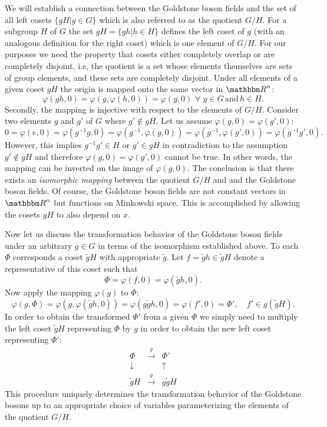 \documentclass[twoside,12pt]{article}
\begin{document}
   We will establish a connection
between the Goldstone boson fields and the set of all left cosets
$\{gH|g\in G\}$ which is also referred to as the quotient $G/H$.
   For a subgroup $H$ of $G$ the set $gH=\{gh|h\in H\}$ defines the left
coset of $g$ (with an analogous definition for the right coset) which is one
element of $G/H$.
   For our purposes we need the property
that cosets either completely overlap or are
completely disjoint,
i.e, the quotient is a
set whose elements themselves are sets of group elements, and these sets
are completely disjoint.
   Under all elements of a given coset $gH$ the origin is mapped onto the
same vector in ${\mathbbm R}^n$:
$$\varphi(gh,0)=\varphi(g,\varphi(h,0))
=\varphi(g,0)\,\,\forall\,\, g\in G\,
\mbox{and}\, h\in H.$$
   Secondly, the mapping is injective with respect to the elements
of $G/H$.
Consider two elements $g$ and $g'$ of $G$ where $g'\not\in g H$.
   Let us assume $\varphi(g,0)=\varphi(g',0)$:
$$0=\varphi(e,0)=\varphi(g^{-1}g,0)
=\varphi(g^{-1},\varphi(g,0))
=\varphi(g^{-1},\varphi(g',0))=\varphi(g^{-1}g',0).$$
   However, this implies $g^{-1}g'\in H$ or $g'\in gH $
in contradiction to the assumption $g'\not\in g H$
and therefore $\varphi(g,0)=\varphi(g',0)$ cannot be true.
   In other words, the mapping can be inverted on the image of
$\varphi(g,0)$.
   The conclusion is that there exists an {\em isomorphic mapping}
between the quotient $G/H$ and and the Goldstone boson
fields.
   Of course, the Goldstone boson fields are not
constant vectors in ${\mathbbm R}^n$ but functions on Minkowski space.
   This is accomplished by allowing the cosets $gH$ to also
depend on $x$.

   Now let us discuss the transformation behavior of the Goldstone boson
fields under an arbitrary $g\in G$ in terms of the
isomorphism established above.
   To each $\Phi$ corresponds a  coset $\tilde{g}H$ with appropriate
$\tilde{g}$.
   Let $f=\tilde{g}h\in \tilde{g}H$ denote a representative of this
coset such that
$$\Phi=\varphi(f,0)=\varphi(\tilde{g}h,0).$$
   Now apply the mapping $\varphi(g)$ to $\Phi$:
$$\varphi(g,\Phi)=\varphi(g,\varphi(\tilde{g}h,0))
=\varphi(g\tilde{g}h,0)=\varphi(f',0)=\Phi',\quad
f'\in g(\tilde{g}H).
$$
   In order to obtain the transformed $\Phi'$ from a given
$\Phi$ we simply need to multiply the left coset $\tilde{g}H$ representing
$\Phi$ by $g$  in order to obtain the new left coset representing $\Phi'$:
\begin{eqnarray*}
\Phi &\stackrel{g}{\to} &\Phi'\\
\downarrow&&\uparrow\\
\tilde g H&\stackrel{g}{\to}&g\tilde g H
\end{eqnarray*}
   This procedure uniquely determines the transformation behavior of
the Goldstone bosons up to an appropriate choice of variables
parameterizing the elements of the quotient $G/H$.
\end{document}
